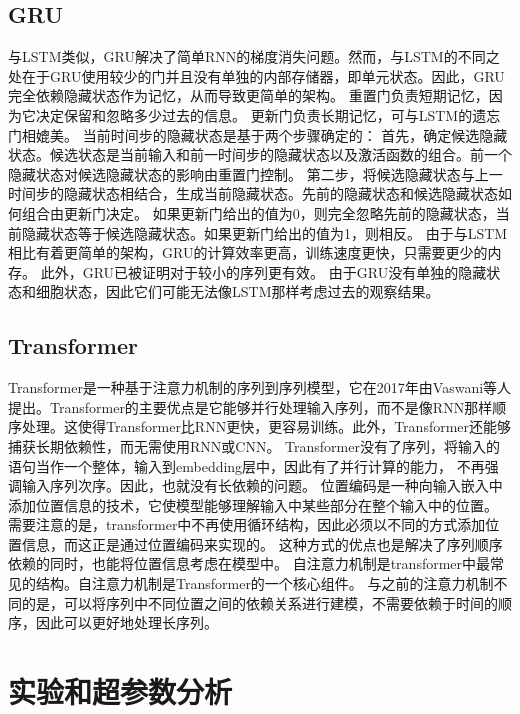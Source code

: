 \documentclass[]{ctexart}
\begin{document}
\subsection{GRU}
与LSTM类似，GRU解决了简单RNN的梯度消失问题。然而，与LSTM的不同之处在于GRU使用较少的门并且没有单独的内部存储器，即单元状态。因此，GRU完全依赖隐藏状态作为记忆，从而导致更简单的架构。
重置门负责短期记忆，因为它决定保留和忽略多少过去的信息。
更新门负责长期记忆，可与LSTM的遗忘门相媲美。
当前时间步的隐藏状态是基于两个步骤确定的：
首先，确定候选隐藏状态。候选状态是当前输入和前一时间步的隐藏状态以及激活函数的组合。前一个隐藏状态对候选隐藏状态的影响由重置门控制。
第二步，将候选隐藏状态与上一时间步的隐藏状态相结合，生成当前隐藏状态。先前的隐藏状态和候选隐藏状态如何组合由更新门决定。
如果更新门给出的值为0，则完全忽略先前的隐藏状态，当前隐藏状态等于候选隐藏状态。如果更新门给出的值为1，则相反。
由于与LSTM相比有着更简单的架构，GRU的计算效率更高，训练速度更快，只需要更少的内存。
此外，GRU已被证明对于较小的序列更有效。
由于GRU没有单独的隐藏状态和细胞状态，因此它们可能无法像LSTM那样考虑过去的观察结果。

\subsection{Transformer}
Transformer是一种基于注意力机制的序列到序列模型，它在2017年由Vaswani等人提出。Transformer的主要优点是它能够并行处理输入序列，而不是像RNN那样顺序处理。这使得Transformer比RNN更快，更容易训练。此外，Transformer还能够捕获长期依赖性，而无需使用RNN或CNN。
Transformer没有了序列，将输入的语句当作一个整体，输入到embedding层中，因此有了并行计算的能力，
不再强调输入序列次序。因此，也就没有长依赖的问题。
位置编码是一种向输入嵌入中添加位置信息的技术，它使模型能够理解输入中某些部分在整个输入中的位置。
需要注意的是，transformer中不再使用循环结构，因此必须以不同的方式添加位置信息，而这正是通过位置编码来实现的。
这种方式的优点也是解决了序列顺序依赖的同时，也能将位置信息考虑在模型中。
自注意力机制是transformer中最常见的结构。自注意力机制是Transformer的一个核心组件。
与之前的注意力机制不同的是，可以将序列中不同位置之间的依赖关系进行建模，不需要依赖于时间的顺序，因此可以更好地处理长序列。

\newpage
\section{实验和超参数分析}
\end{document}
